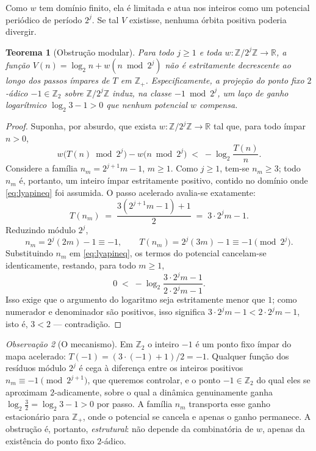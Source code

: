 \documentclass[10pt]{amsart}
\newtheorem{theorem}{Teorema}
\theoremstyle{definition}
\theoremstyle{remark}
\newtheorem{remark}[theorem]{Observação}
\newcommand{\Z}{\mathbb{Z}}
\newcommand{\R}{\mathbb{R}}
\newcommand{\Ztwo}{\Z_2}
\begin{document}
Como $w$ tem domínio finito, ela é limitada e atua nos inteiros como um potencial periódico de período $2^j$. Se tal $V$ existisse, nenhuma órbita positiva poderia divergir.

\begin{theorem}[Obstrução modular]\label{thm:main}
Para todo $j\ge 1$ e toda $w:\Z/2^j\Z\to\R$, a função $V(n)=\log_2 n+w(n\bmod 2^j)$ não é estritamente decrescente ao longo dos passos ímpares de $T$ em $\Z_+$. Especificamente, a projeção do ponto fixo $2$-ádico $-1\in\Ztwo$ sobre $\Z/2^j\Z$ induz, na classe $-1\bmod 2^j$, um laço de ganho logarítmico $\log_2 3-1>0$ que nenhum potencial $w$ compensa.
\end{theorem}

\begin{proof}
Suponha, por absurdo, que exista $w : \Z/2^j\Z \to \R$ tal que, para todo ímpar $n > 0$,
\begin{equation}\label{eq:lyapineq}
w\bigl(T(n) \bmod 2^j\bigr) - w\bigl(n \bmod 2^j\bigr) \;<\; -\log_2 \frac{T(n)}{n}.
\end{equation}
Considere a família $n_m = 2^{j+1}m - 1$, $m \ge 1$. Como $j \ge 1$, tem-se $n_m \ge 3$; todo $n_m$ é, portanto, um inteiro ímpar estritamente positivo, contido no domínio onde \eqref{eq:lyapineq} foi assumida. O passo acelerado avalia-se exatamente:
\[
T(n_m) \;=\; \frac{3(2^{j+1}m-1)+1}{2} \;=\; 3\cdot 2^j m - 1 .
\]
Reduzindo módulo $2^j$,
\[
n_m = 2^j(2m) - 1 \equiv -1, \qquad
T(n_m) = 2^j(3m) - 1 \equiv -1 \pmod{2^j}.
\]
Substituindo $n_m$ em \eqref{eq:lyapineq}, os termos do potencial cancelam-se identicamente, restando, para todo $m \ge 1$,
\[
0 \;<\; -\log_2 \frac{3\cdot 2^j m - 1}{2\cdot 2^j m - 1}.
\]
Isso exige que o argumento do logaritmo seja estritamente menor que $1$; como numerador e denominador são positivos, isso significa $3\cdot 2^j m - 1 < 2\cdot 2^j m - 1$, isto é, $3 < 2$ --- contradição.
\end{proof}

\begin{remark}[O mecanismo]\label{rem:mechanism}
Em $\Ztwo$ o inteiro $-1$ é um ponto fixo ímpar do mapa acelerado: $T(-1) = (3\cdot(-1)+1)/2 = -1$. Qualquer função dos resíduos módulo $2^j$ é cega à diferença entre os inteiros positivos $n_m \equiv -1 \pmod{2^{j+1}}$, que queremos controlar, e o ponto $-1 \in \Ztwo$ do qual eles se aproximam $2$-adicamente, sobre o qual a dinâmica genuinamente ganha $\log_2 \tfrac32 = \log_2 3 - 1 > 0$ por passo. A família $n_m$ transporta esse ganho estacionário para $\Z_+$, onde o potencial se cancela e apenas o ganho permanece. A obstrução é, portanto, \emph{estrutural}: não depende da combinatória de $w$, apenas da existência do ponto fixo $2$-ádico.
\end{remark}
\end{document}
